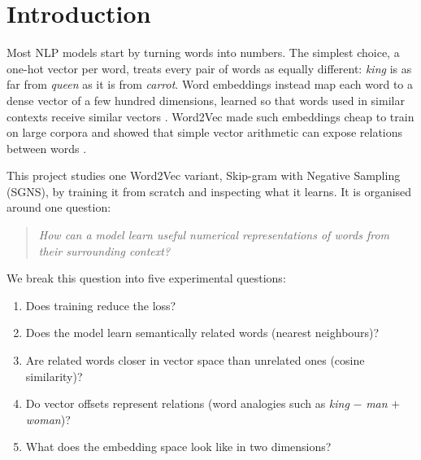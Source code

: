 \section{Introduction}
\label{sec:introduction}

Most NLP models start by turning words into numbers. The simplest choice, a one-hot vector per word, treats every pair of words as equally different: \textit{king} is as far from \textit{queen} as it is from \textit{carrot}. Word embeddings instead map each word to a dense vector of a few hundred dimensions, learned so that words used in similar contexts receive similar vectors \citep{harris1954distributional, firth1957synopsis, bengio2003neural}. Word2Vec \citep{mikolov2013efficient, mikolov2013distributed} made such embeddings cheap to train on large corpora and showed that simple vector arithmetic can expose relations between words \citep{mikolov2013linguistic}.

This project studies one Word2Vec variant, Skip-gram with Negative Sampling (SGNS), by training it from scratch and inspecting what it learns. It is organised around one question:

\begin{quote}
\emph{How can a model learn useful numerical representations of words from their surrounding context?}
\end{quote}

We break this question into five experimental questions:
\begin{enumerate}
    \item[\textbf{Q1}] Does training reduce the loss?
    \item[\textbf{Q2}] Does the model learn semantically related words (nearest neighbours)?
    \item[\textbf{Q3}] Are related words closer in vector space than unrelated ones (cosine similarity)?
    \item[\textbf{Q4}] Do vector offsets represent relations (word analogies such as \textit{king} $-$ \textit{man} $+$ \textit{woman})?
    \item[\textbf{Q5}] What does the embedding space look like in two dimensions?
\end{enumerate}

